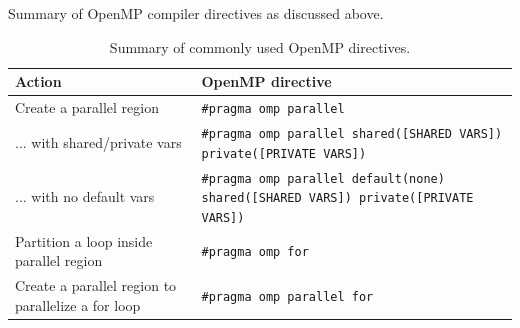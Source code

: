 Summary of OpenMP compiler directives as discussed above.
\begin{table}[htbp!]
    \centering
    \begin{tabular}{l|l} \hline
      Action & OpenMP directive\\ \hline
      Create a parallel region & \texttt{\#pragma omp parallel} \\
      ... with shared/private vars & \texttt{\#pragma omp parallel shared([SHARED VARS]) private([PRIVATE VARS])} \\
            ... with no default vars & \texttt{\#pragma omp parallel default(none) shared([SHARED VARS]) private([PRIVATE VARS])} \\
       Partition a loop inside parallel region & \texttt{\#pragma omp for} \\
       Create a parallel region to parallelize a for loop & \texttt{\#pragma omp parallel for} \\
    \hline\end{tabular}
    \caption{Summary of commonly used OpenMP directives.}
    \label{ompDirectives.tab}
\end{table}





\printbibliography[heading=subbibliography]